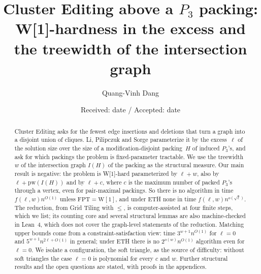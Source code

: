 \documentclass[smallextended,envcountsame,envcountsect]{svjour3}
\begin{document}
\title{Cluster Editing above a $P_3$ packing: W[1]-hardness in the excess and the treewidth of the intersection graph}
\author{Quang-Vinh Dang}
\date{Received: date / Accepted: date}
\maketitle
\begin{abstract}
Cluster Editing asks for the fewest edge insertions and deletions that turn a graph into a disjoint union of cliques.
Li, Pilipczuk and Sorge parameterize it by the excess~$\ell$ of the solution size over the size of a modification-disjoint packing~$H$ of induced $P_3$'s, and ask for which packings the problem is fixed-parameter tractable.
We use the treewidth~$w$ of the intersection graph $I(H)$ of the packing as the structural measure.
Our main result is negative: the problem is W[1]-hard parameterized by $\ell+w$, also by $\ell+\mathrm{pw}(I(H))$ and by $\ell+c$, where $c$ is the maximum number of packed $P_3$'s through a vertex, even for pair-maximal packings. So there is no algorithm in time $f(\ell,w)n^{O(1)}$ unless $\mathrm{FPT}=\mathrm{W[1]}$, and under ETH none in time $f(\ell,w)n^{o(\sqrt\ell)}$.
The reduction, from Grid Tiling with $\le$, is computer-assisted at four finite steps, which we list; its counting core and several structural lemmas are also machine-checked in Lean~4, which does not cover the graph-level statements of the reduction.
Matching upper bounds come from a constraint-satisfaction view: time $3^{w+1}n^{O(1)}$ for $\ell=0$ and $5^{w+1}n^{2\ell+O(1)}$ in general; under ETH there is no $2^{o(w)}n^{O(1)}$ algorithm even for $\ell=0$.
We isolate a configuration, the soft triangle, as the source of difficulty: without soft triangles the case $\ell=0$ is polynomial for every $c$ and $w$.
Further structural results and the open questions are stated, with proofs in the appendices.
\end{abstract}









\end{document}

